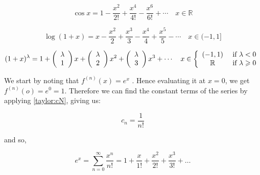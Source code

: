 \documentclass[english,course]{Notes}
\begin{document}
$$\cos x = 1 - \frac { x ^ { 2 } } { 2 ! } + \frac { x ^ { 4 } } { 4 ! } - \frac { x ^ { 6 } } { 6 ! } + \cdots \quad x \in \mathbb { R }$$

$$\log ( 1 + x ) = x - \frac { x ^ { 2 } } { 2 } + \frac { x ^ { 3 } } { 3 } - \frac { x ^ { 4 } } { 4 } + \frac { x ^ { 5 } } { 5 } - \cdots \quad x \in ( - 1,1 ]$$

$$( 1 + x ) ^ { \lambda } = 1 + \left( \begin{array} { c } { \lambda } \\ { 1 } \end{array} \right) x + \left( \begin{array} { c } { \lambda } \\ { 2 } \end{array} \right) x ^ { 2 } + \left( \begin{array} { c } { \lambda } \\ { 3 } \end{array} \right) x ^ { 3 } + \cdots \quad x \in \left\{ \begin{array} { c c } { ( - 1,1 ) } & { \text { if } \lambda < 0 } \\ { \mathbb { R } } & { \text { if } \lambda \geqslant 0 } \end{array} \right.$$



\par{We start by noting that $f^{(n)}(x) = e^x$ . Hence evaluating it at $ x = 0 $, we get $f^{(n)}(o) = e^0 = 1$. Therefore we can find the constant terms of the series by applying \ref{taylor:cN}, giving us:}

$$ c_n = \frac{1}{n!}$$

and so,

$$ e^x = \sum^{\infty}_{n=0}\frac{x^n}{n!} = 1 + \frac{x}{1!} + \frac{x^2}{2!} + \frac{x^3}{3!} + \dots$$

\end{document}

